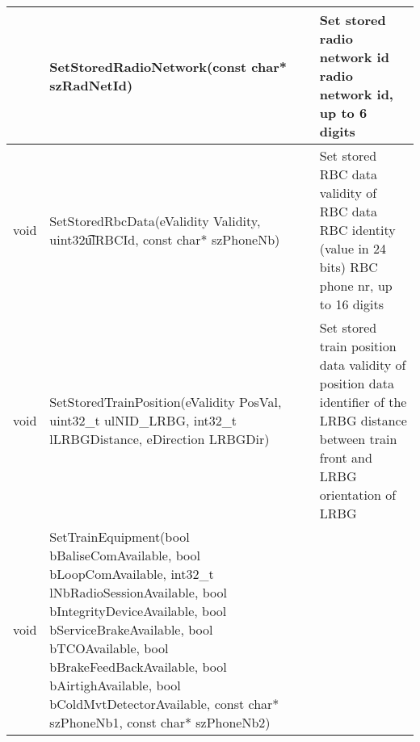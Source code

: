 \documentclass{template/openetcs_article}
\begin{document}
\begin{longtable}{|l|l|l|}
	&	\begin{minipage}[t]{0.50\linewidth} SetStoredRadioNetwork(const char* szRadNetId) \end{minipage} 
	&	\begin{minipage}[t]{0.45\linewidth} Set stored radio network id
	\newline [in] radio network id, up to 6 digits \end{minipage} \\
	\hline
		\begin{minipage}[t]{0.10\linewidth} void \end{minipage} 
	&	\begin{minipage}[t]{0.50\linewidth} SetStoredRbcData(eValidity Validity, uint32\t ulRBCId, const char* szPhoneNb) \end{minipage} 
	&	\begin{minipage}[t]{0.45\linewidth} Set stored RBC data
	\newline [in] validity of RBC data
	\newline [in] RBC identity (value in 24 bits)
	\newline [in] RBC phone nr, up to 16 digits \end{minipage} \\
	\hline
		\begin{minipage}[t]{0.10\linewidth} void \end{minipage} 
	&	\begin{minipage}[t]{0.50\linewidth} SetStoredTrainPosition(eValidity PosVal, uint32\_t ulNID\_LRBG, int32\_t lLRBGDistance, eDirection LRBGDir) \end{minipage} 
	&	\begin{minipage}[t]{0.45\linewidth} Set stored train position data
	\newline [in] validity of position data
	\newline [in] identifier of the LRBG
	\newline [in] distance between train front and LRBG
	\newline [in] orientation of LRBG \end{minipage} \\
	\hline
		\begin{minipage}[t]{0.10\linewidth} void \end{minipage} 
	&	\begin{minipage}[t]{0.50\linewidth} SetTrainEquipment(bool bBaliseComAvailable, bool bLoopComAvailable, int32\_t lNbRadioSessionAvailable, bool bIntegrityDeviceAvailable, bool bServiceBrakeAvailable, bool bTCOAvailable, bool bBrakeFeedBackAvailable, bool bAirtighAvailable, bool bColdMvtDetectorAvailable, const char* szPhoneNb1, const char* szPhoneNb2) \end{minipage} 

\end{longtable}
\end{document}
